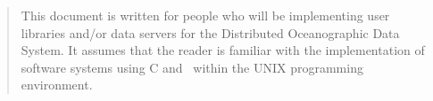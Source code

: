 
%
%
%

\small

\begin{quotation}
  This document is written for people who will be implementing user libraries
  and/or data servers for the Distributed Oceanographic Data System. It
  assumes that the reader is familiar with the implementation of software
  systems using C and \Cpp\ within the UNIX programming environment.
\end{quotation}

\normalsize
